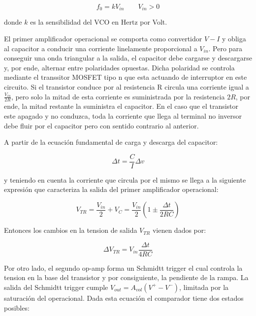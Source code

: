 \begin{equation}
f_0 = kV_{in}  \qquad  V_{in} > 0
\end{equation}

donde $k$ es la sensibilidad del VCO en Hertz por Volt. \newline


El primer amplificador operacional se comporta como convertidor $V-I$ y obliga al capacitor a conducir una corriente linelamente proporcional a $V_{in}$. Pero para conseguir una onda triangular a la salida, el capacitor debe cargarse y descargarse y, por ende, alternar entre polaridades opuestas. Dicha polaridad se controla mediante el transsitor MOSFET tipo n que esta actuando de interruptor en este circuito. Si el transistor conduce por al resistencia R circula una corriente igual a $\frac{V_{in}}{2R}$, pero solo la mitad de esta corriente es suministrada por la resistencia $2R$, por ende, la mitad restante la suministra el capacitor. En el caso que el transistor este apagado y no conduzca, toda la corriente que llega al terminal no inversor debe fluir por el capacitor pero con sentido contrario al anterior. 


A partir de la ecuación fundamental de carga y descarga del capacitor:

\begin{equation}
\Delta t = \frac{C}{I}\Delta v 
\end{equation}

y teniendo en cuenta la corriente que circula por el mismo se llega a la siguiente expresión que caracteriza la salida del primer amplificador operacional:

\begin{equation}\label{eq:rampa}
V_{TR} = \frac{V_{in}}{2} + V_C = \frac{V_{in}}{2}(1 \pm \frac{\Delta t}{2RC})
\end{equation}

Entonces los cambios en la tension de salida $V_{TR}$ vienen dados por:

\begin{equation}
\Delta V_{TR	} = V_{in} \frac{\Delta t}{4RC}
\end{equation}

 

Por otro lado, el segundo op-amp forma un Schmidtt trigger el cual controla la tension en la base del transistor y por consiguiente, la pendiente de la rampa. La salida del Schmidtt trigger cumple $V_{out} = A_{vol}(V^{+} - V^{-})$, limitada por la saturación del operacional. Dada esta ecuación el comparador tiene dos estados posibles:

